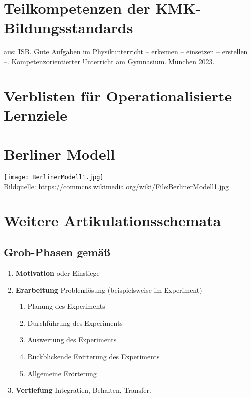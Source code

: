 \appendix
\chapter{Teilkompetenzen der KMK-Bildungsstandards}\label{A_kmk}
aus: ISB. Gute Aufgaben im Physikunterricht – erkennen – einsetzen – erstellen –. Kompetenzorientierter Unterricht am Gymnasium. München 2023.


\chapter{Verblisten für Operationalisierte Lernziele}\label{A_Verbliste}


\chapter{Berliner Modell}\label{A_BerlinerModell}

\texttt{[image: BerlinerModell1.jpg]} \\
Bildquelle: \url{https://commons.wikimedia.org/wiki/File:BerlinerModell1.jpg}

\chapter{Weitere Artikulationsschemata}

\section{Grob-Phasen gem\"{a}{\ss} \textcite{DuitHausslerKircher}}
\begin{enumerate}
	\item {\bf Motivation} oder Einstiege
	\item {\bf Erarbeitung} Probleml\"{o}sung (beispielsweise im Experiment)
	\begin{enumerate}
	\item
	Planung des Experiments
	\item
	Durchf\"{u}hrung des Experiments
	\item
	Auswertung des Experiments
	\item
	R\"{u}ckblickende Er\"{o}rterung des Experiments
	\item
	Allgemeine Er\"{o}rterung
	\end{enumerate}
	\item {\bf Vertiefung} Integration, Behalten, Transfer.
\end{enumerate}


